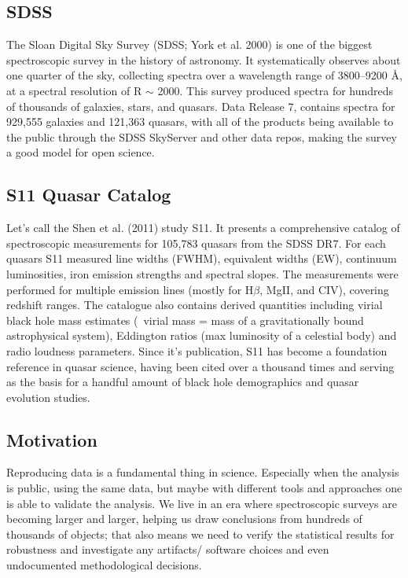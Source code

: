 \documentclass[11pt,a4paper]{article}
\begin{document}
\subsection{SDSS}
The Sloan Digital Sky Survey (SDSS; York et al. 2000) is one of the biggest spectroscopic survey in the history of astronomy. It systematically observes about one quarter of the sky, collecting spectra over a wavelength range of 3800–9200 Å, at a spectral resolution of R $\sim$ 2000. This survey produced spectra for hundreds of thousands of galaxies, stars, and quasars.  Data Release 7, contains spectra for 929,555 galaxies and 121,363 quasars, with all of the products being available to the public through the SDSS SkyServer and other data repos, making the survey a good model for open science. 

\subsection{S11 Quasar Catalog}

Let's call the Shen et al. (2011) study S11. It presents a comprehensive catalog of spectroscopic measurements for 105,783 quasars from the SDSS DR7. For each quasars S11 measured line widths (FWHM), equivalent widths (EW), continuum luminosities, iron emission strengths and spectral slopes. The measurements were performed for multiple emission lines (mostly for H$\beta$, MgII, and CIV), covering redshift ranges. The catalogue also contains derived quantities including virial black hole mass estimates ( virial mass = mass of a gravitationally bound astrophysical system), Eddington ratios (max luminosity of a celestial body) and radio loudness parameters. Since it's publication, S11 has become a foundation reference in quasar science, having been cited over a thousand times and serving as the basis for a handful amount of black hole demographics and quasar evolution studies. 

\subsection{Motivation}
Reproducing data is a fundamental thing in science. Especially when the analysis is public, using the same data, but maybe with different tools and approaches one is able to validate the analysis. We live in an era where spectroscopic surveys are becoming larger and larger, helping us draw conclusions from hundreds of thousands of objects; that also means we need to verify the statistical results for robustness and investigate any artifacts/ software choices and even undocumented methodological decisions.
\end{document}
